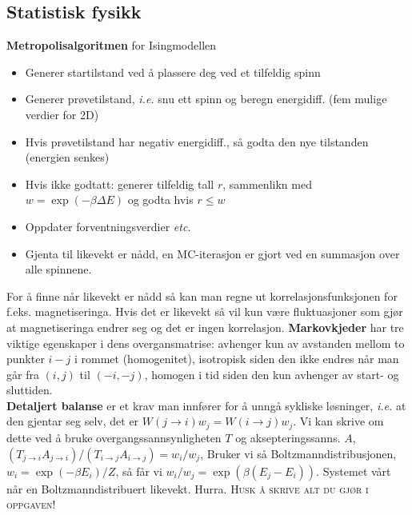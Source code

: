 \documentclass[12pt,a4paper,twocolumn]{article}
\begin{document}
\begin{flushleft}
\subsection{Statistisk fysikk} %
\label{sub:statistisk_fysikk}
\textbf{Metropolisalgoritmen} for Isingmodellen
\begin{itemize}
  \item Generer startilstand ved å plassere deg ved et tilfeldig spinn
  \item Generer prøvetilstand, \emph{i.e.} snu ett spinn og beregn energidiff. (fem mulige verdier for 2D)
  \item Hvis prøvetilstand har negativ energidiff., så godta den nye tilstanden (energien senkes)
  \item Hvis ikke godtatt: generer tilfeldig tall $r$, sammenlikn med $w=\exp(-\beta\Delta E)$ og godta hvis $r\leq w$
  \item Oppdater forventningsverdier \emph{etc.}
  \item Gjenta til likevekt er nådd, en MC-iterasjon er gjort ved en summasjon over alle spinnene.
\end{itemize}
For å finne når likevekt er nådd så kan man regne ut korrelasjonsfunksjonen for f.eks. magnetiseringa. Hvis det er likevekt så vil kun være fluktuasjoner som gjør at magnetiseringa endrer seg og det er ingen korrelasjon.
\textbf{Markovkjeder} har tre viktige egenskaper i dens overgansmatrise: avhenger kun av avstanden mellom to punkter $i-j$ i rommet (homogenitet), isotropisk siden den ikke endres når man går fra $(i,j)$ til $(-i,-j)$, homogen i tid siden den kun avhenger av start- og sluttiden.\\
\textbf{Detaljert balanse} er et krav man innfører for å unngå sykliske løsninger, \emph{i.e.} at den gjentar seg selv, det er $W(j\to i)w_j=W(i\to j)w_j$. Vi kan skrive om dette ved å bruke overgangssannsynligheten $T$ og aksepteringssanns. $A$, $(T_{j\to i}A_{j\to i})/(T_{i\to j}A_{i\to j}) = w_i/w_j$, Bruker vi så Boltzmanndistribusjonen, $w_i = \exp(-\beta E_i)/Z$, så får vi $w_i/w_j = \exp(\beta(E_j-E_i))$. Systemet vårt når en Boltzmanndistribuert likevekt. Hurra.
\textsc{\large Husk å skrive alt du gjør i oppgaven!}

\end{flushleft}
\end{document}
